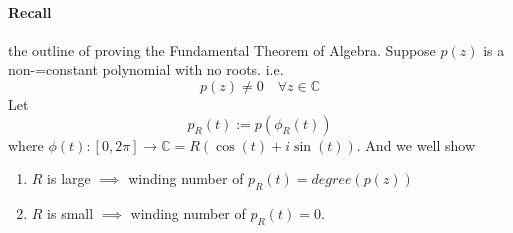 \documentclass[11pt]{article}
\begin{document}
		\paragraph{Recall} the outline of proving the Fundamental Theorem of Algebra. 
		\newline
		Suppose $p(z)$ is a non-=constant polynomial with no roots. i.e.
		\[
			p(z) \neq 0\quad \forall z \in \mathbb{C}
		\]
		Let 
		\[
			p_R(t) := p(\phi_R(t))
		\]
		where $\phi(t): [0, 2\pi] \to \mathbb{C} = R(\cos(t) + i\sin(t))$.
		\newline
		And we well show
		\begin{enumerate}
			\item $R$ is large $\implies$ winding number of $p_R(t) = degree(p(z))$
			\item $R$ is small $\implies$ winding number of $p_R(t) = 0$.
		\end{enumerate}
\end{document}
